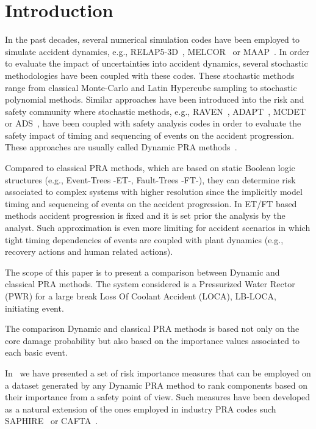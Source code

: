 \section{Introduction}
\label{sec:introduction}

In the past decades, several numerical simulation codes have been employed 
to simulate accident dynamics, e.g., RELAP5-3D~\cite{relap5}, MELCOR~\cite{Melcor} or MAAP~\cite{maap}. 
In order to evaluate the impact of uncertainties into accident dynamics, 
several stochastic methodologies have been coupled with these codes. 
These stochastic methods range from classical Monte-Carlo and Latin Hypercube 
sampling to stochastic polynomial methods. 
Similar approaches have been introduced into the risk and safety community 
where stochastic methods, e.g., RAVEN~\cite{RAVEN_PSAM_2014}, ADAPT~\cite{ADAPT}, MCDET~\cite{MCDET} or ADS~\cite{ADS}, 
have been coupled with safety analysis codes in order to evaluate the safety 
impact of timing and sequencing of events on the accident progression. 
These approaches are usually called Dynamic PRA methods~\cite{DEVOOGHT_DynamicPRA}.   

Compared to classical PRA methods, which are
based on static Boolean logic structures (e.g., Event-Trees -ET-, Fault-Trees -FT-), 
they can determine risk associated to complex systems with higher resolution 
since the implicitly model timing and sequencing of events
on the accident progression. In ET/FT based methods accident progression is fixed
and it is set prior the analysis by the analyst.
Such approximation is even more limiting for accident scenarios in which tight timing 
dependencies of events are coupled with plant dynamics (e.g., recovery actions and human 
related actions).

The scope of this paper is to present a comparison between Dynamic and classical PRA
methods. The system considered is a Pressurized Water Rector (PWR) for a large break 
Loss Of Coolant Accident (LOCA), LB-LOCA, initiating event.

The comparison Dynamic and classical PRA
methods is based not only on the core damage probability but also
based on the importance values associated to each basic event.

In~\cite{RIM_part1} we have presented a set of risk importance 
measures that can be employed on a dataset generated by any Dynamic PRA method
to rank components based on their importance from a safety point of view.
Such measures have been developed as a natural extension of the ones employed
in industry PRA codes such SAPHIRE~\cite{saphire} or CAFTA~\cite{cafta}.

